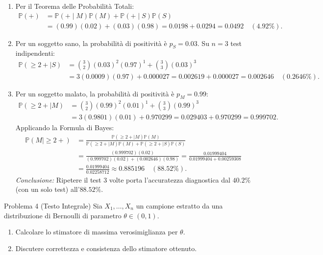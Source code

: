 \documentclass[11pt,a4paper]{article}
\newcommand{\Prob}{\mathbb{P}}
\begin{document}
\begin{soluzionebox}
\begin{enumerate}[label=(\alph*)]
    \item Per il Teorema delle Probabilità Totali:
    \begin{align*}
    \Prob(+) &= \Prob(+ \mid M)\Prob(M) + \Prob(+ \mid S)\Prob(S) \\
    &= (0.99)(0.02) + (0.03)(0.98) = 0.0198 + 0.0294 = \mathbf{0.0492} \quad (\mathbf{4.92\%}).
    \end{align*}

    \item Per un soggetto sano, la probabilità di positività è $p_S = 0.03$. Su $n = 3$ test indipendenti:
    \begin{align*}
    \Prob(\ge 2 + \mid S) &= \binom{3}{2}(0.03)^2(0.97)^1 + \binom{3}{3}(0.03)^3 \\
    &= 3(0.0009)(0.97) + 0.000027 = 0.002619 + 0.000027 = \mathbf{0.002646} \quad (\mathbf{0.2646\%}).
    \end{align*}

    \item Per un soggetto malato, la probabilità di positività è $p_M = 0.99$:
    \begin{align*}
    \Prob(\ge 2 + \mid M) &= \binom{3}{2}(0.99)^2(0.01)^1 + \binom{3}{3}(0.99)^3 \\
    &= 3(0.9801)(0.01) + 0.970299 = 0.029403 + 0.970299 = \mathbf{0.999702}.
    \end{align*}
    Applicando la Formula di Bayes:
    \begin{align*}
    \Prob(M \mid \ge 2 +) &= \frac{\Prob(\ge 2 + \mid M)\Prob(M)}{\Prob(\ge 2 + \mid M)\Prob(M) + \Prob(\ge 2 + \mid S)\Prob(S)} \\
    &= \frac{(0.999702)(0.02)}{(0.999702)(0.02) + (0.002646)(0.98)} = \frac{0.01999404}{0.01999404 + 0.00259308} \\
    &= \frac{0.01999404}{0.02258712} \approx \mathbf{0.885196} \quad (\mathbf{88.52\%}).
    \end{align*}
    \emph{Conclusione:} Ripetere il test 3 volte porta l'accuratezza diagnostica dal $40.2\%$ (con un solo test) all'$\mathbf{88.52\%}$.
\end{enumerate}
\end{soluzionebox}

\begin{problemabox}{Problema 4 (Testo Integrale)}
Sia $X_1,\dots,X_n$ un campione estratto da una distribuzione di Bernoulli di parametro $\theta \in (0,1)$.
\begin{enumerate}[label=(\alph*)]
    \item Calcolare lo stimatore di massima verosimiglianza per $\theta$.
    \item Discutere correttezza e consistenza dello stimatore ottenuto.
\end{enumerate}
\end{problemabox}
\end{document}
